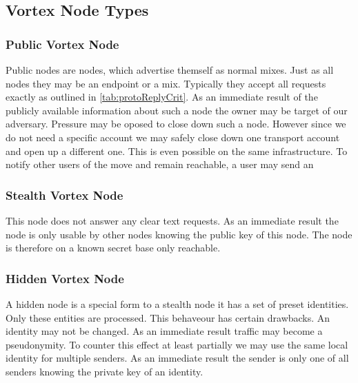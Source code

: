 \subsection{Vortex Node Types}

\subsubsection{Public Vortex Node}
Public nodes are nodes, which advertise themself as normal mixes. Just as all nodes they may be an endpoint or a mix. Typically they accept all requests exactly as outlined in \ref{tab:protoReplyCrit}. As an immediate result of the publicly available information about such a node the owner may be target of our adversary. Pressure may be oposed to close down such a node. However since we do not need a specific account we may safely close down one transport account and open up a different one. This is even possible on the same infrastructure. To notify other users of the move and remain reachable, a user may send an 

\subsubsection{Stealth Vortex Node\label{sec:stealthNode}}
This node does not answer any clear text requests. As an immediate result the node is only usable by other nodes knowing the public key of this node. The node is therefore on a known secret base only reachable.

\subsubsection{Hidden Vortex Node\label{sec:hiddenNode}}
A hidden node is a special form to a stealth node it has a set of preset identities. Only these entities are processed. This behaveour has certain drawbacks. An identity may not be changed. As an immediate result traffic may become a pseudonymity. To counter this effect at least partially we may use the same local identity for multiple senders. As an immediate result the sender is only one of all senders knowing the private key of an identity.

